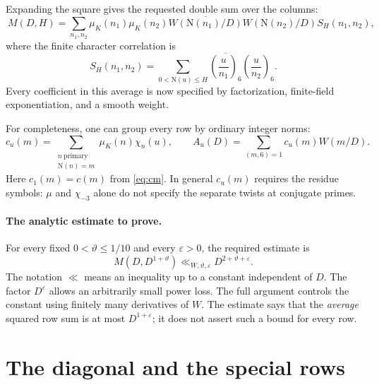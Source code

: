 \documentclass[11pt]{article}
\newcommand{\N}{\mathrm N}
\newcommand{\muk}{\mu_K}
\newcommand{\ch}{\chi_{-3}}
\numberwithin{equation}{section}
\begin{document}
Expanding the square gives the requested double sum over the columns:
\begin{equation}\label{eq:double}
 \boxed{\ M(D,H)=\sum_{n_1,n_2}\muk(n_1)\muk(n_2)
 \overline{W(\N(n_1)/D)}W(\N(n_2)/D)S_H(n_1,n_2),\ }
\end{equation}
where the finite character correlation is
\begin{equation}\label{eq:S}
 S_H(n_1,n_2)=\sum_{0<\N(u)\le H}
 \overline{\left(\frac{u}{n_1}\right)_6}
 \left(\frac{u}{n_2}\right)_6.
\end{equation}
Every coefficient in this average is now specified by factorization,
finite-field exponentiation, and a smooth weight.

For completeness, one can group every row by ordinary integer norms:
\begin{equation}\label{eq:cu}
 c_u(m)=\sum_{\substack{n\ \mathrm{primary}\\\N(n)=m}}
 \muk(n)\chi_n(u),\qquad
 A_u(D)=\sum_{(m,6)=1}c_u(m)W(m/D).
\end{equation}
Here $c_1(m)=c(m)$ from \eqref{eq:cm}. In general $c_u(m)$ requires the
residue symbols: $\mu$ and $\ch$ alone do not specify the separate twists
at conjugate primes.

\paragraph{The analytic estimate to prove.}
For every fixed $0<\vartheta\le1/10$ and every $\varepsilon>0$, the
required estimate is
\begin{equation}\label{eq:MS}
 \boxed{\quad M(D,D^{1+\vartheta})
 \ll_{W,\vartheta,\varepsilon}D^{2+\vartheta+\varepsilon}.
 \quad}
\end{equation}
The notation $\ll$ means an inequality up to a constant independent of
$D$. The factor $D^\varepsilon$ allows an arbitrarily small power loss.
The full argument controls the constant using finitely many derivatives
of $W$. The estimate says that the \emph{average} squared row sum is
at most $D^{1+\varepsilon}$; it does not assert such a bound for every row.

\section{The diagonal and the special rows}\label{sec:diagonal}
\end{document}
